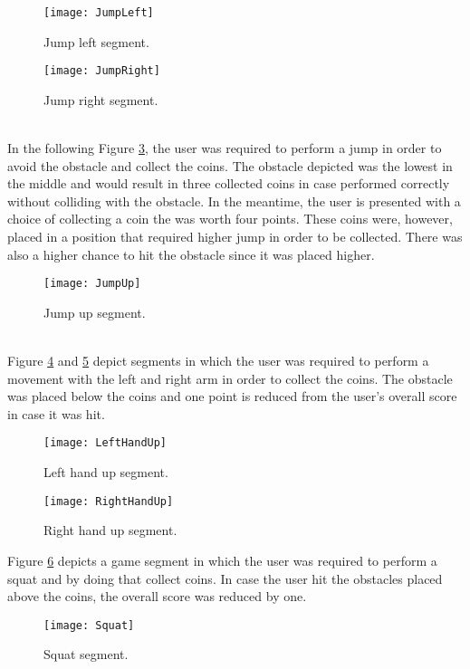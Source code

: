\begin{figure}[h]
    \centering
    \texttt{[image: JumpLeft]}
    \caption{Jump left segment.}
    \label{fig:jumpleft}
\end{figure}
\begin{figure}[h]
    \centering
    \texttt{[image: JumpRight]}
    \caption{Jump right segment.}
    \label{fig:jumpright}
\end{figure}\\
In the following Figure \ref{fig:jumpup}, the user was required to perform a jump in order to avoid the obstacle and collect the coins. The obstacle depicted was the lowest in the middle and would result in three collected coins in case performed correctly without colliding with the obstacle. In the meantime, the user is presented with a choice of collecting a coin the was worth four points. These coins were, however, placed in a position that required higher jump in order to be collected. There was also a higher chance to hit the obstacle since it was placed higher. \\
\begin{figure}[h]
    \centering
    \texttt{[image: JumpUp]}
    \caption{Jump up segment.}
    \label{fig:jumpup}
\end{figure}\\
Figure \ref{fig:leftup} and \ref{fig:rightup} depict segments in which the user was required to perform a movement with the left and right arm in order to collect the coins. The obstacle was placed below the coins and one point is reduced from the user's overall score in case it was hit.\\
\begin{figure}[h]
    \centering
    \texttt{[image: LeftHandUp]}
    \caption{Left hand up segment.}
    \label{fig:leftup}
\end{figure}
\begin{figure}[h]
    \centering
    \texttt{[image: RightHandUp]}
    \caption{Right hand up segment.}
    \label{fig:rightup}
\end{figure}

Figure \ref{fig:squat} depicts a game segment in which the user was required to perform a squat and by doing that collect coins. In case the user hit the obstacles placed above the coins, the overall score was reduced by one.\\
\begin{figure}[h]
    \centering
    \texttt{[image: Squat]}
    \caption{Squat segment.}
    \label{fig:squat}
\end{figure}

